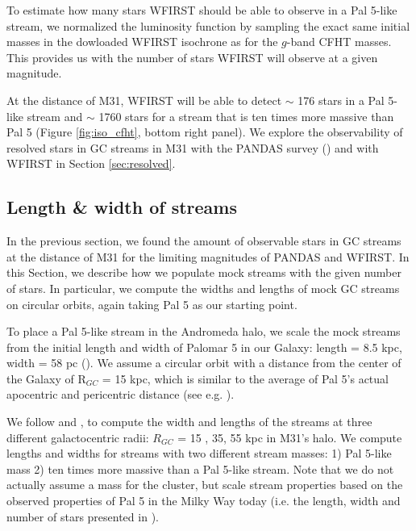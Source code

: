 \documentclass[twocolumn]{aastex62}
\begin{document}
To estimate how many stars WFIRST should be able to observe in a Pal 5-like stream, we normalized the luminosity function by sampling the exact same initial masses in the dowloaded WFIRST isochrone as for the $g$-band CFHT masses. This provides us with the number of stars WFIRST will observe at a given magnitude. 

At the distance of M31, WFIRST will be able to detect $\sim$ 176 stars in a Pal 5-like stream and $\sim$ 1760 stars for a stream that is ten times more massive than Pal 5 (Figure \ref{fig:iso_cfht}, bottom right panel). We explore the observability of resolved stars in GC streams in M31 with the PANDAS survey (\citealt{mcconnachie09}) and with WFIRST in Section \ref{sec:resolved}. 




\subsection{Length \& width of streams}
\label{sec:length}
In the previous section, we found the amount of observable stars in GC streams at the distance of M31 for the limiting magnitudes of PANDAS and WFIRST. In this Section, we describe how we populate mock streams with the given number of stars. In particular, we compute the widths and lengths of mock GC streams on circular orbits, again taking Pal 5 as our starting point. 

To place a Pal 5-like stream in the Andromeda halo, %
we scale the mock streams from the initial length and width of Palomar 5 in our Galaxy: length = 8.5 kpc, width = 58 pc (\citealt{ibata16}). We assume a circular orbit with a distance from the center of the Galaxy of R$_{GC}$ = 15 kpc, which is similar to the average of Pal 5's actual apocentric and pericentric distance (see e.g. \citealt{erkal17}). 

We follow \citet{johnston98} and \citet{johnston01}, to compute the width and lengths of the streams at three different galactocentric radii: $R_{GC}$ = 15 , 35, 55 kpc in M31's halo. We compute lengths and widths for streams with two different stream masses: 1) Pal 5-like mass 2) ten times more massive than a Pal 5-like stream. Note that we do not actually assume a mass for the cluster, but scale stream properties based on the observed properties of Pal 5 in the Milky Way today (i.e. the length, width and number of stars presented in \citealt{ibata16}).  
\end{document}
